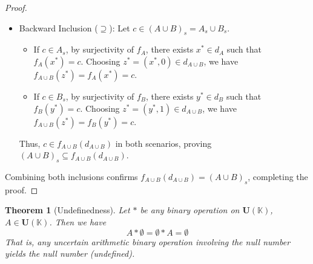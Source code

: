 \documentclass[a4paper,12pt,twoside]{memoir}
\newtheorem{theorem}{Theorem}[chapter]
\newcommand{\tsbd}[1]{\mathbf{U}(\mathbb{#1})}
\begin{document}
\begin{proof}
\begin{enumerate}[leftmargin=*]
\begin{itemize}[leftmargin=*]
				\item Backward Inclusion ($\supseteq$):
				Let $c \in (A \cup B)_s = A_s \cup B_s$.
				\begin{itemize}
					\item If $c \in A_s$, by surjectivity of $f_A$, there exists $x^* \in d_A$ such that $f_A(x^*) = c$. Choosing $z^* = (x^*, 0) \in d_{A \cup B}$, we have $f_{A \cup B}(z^*) = f_A(x^*) = c$.
					\item If $c \in B_s$, by surjectivity of $f_B$, there exists $y^* \in d_B$ such that $f_B(y^*) = c$. Choosing $z^* = (y^*, 1) \in d_{A \cup B}$, we have $f_{A \cup B}(z^*) = f_B(y^*) = c$.
				\end{itemize}
				Thus, $c \in f_{A \cup B}(d_{A \cup B})$ in both scenarios, proving $(A \cup B)_s \subseteq f_{A \cup B}(d_{A \cup B})$.
			\end{itemize}
		\end{enumerate}
		
		Combining both inclusions confirms $f_{A \cup B}(d_{A \cup B}) = (A \cup B)_s$, completing the proof.
	\end{proof}
	\begin{theorem}[Undefinedness]
		Let $*$ be any binary operation on $\tsbd{K}$, $A \in \tsbd{K}$. Then we have
		\[A * \emptyset = \emptyset * A= \emptyset\]
		That is, any uncertain arithmetic binary operation involving the null number yields the null number (undefined).
	\end{theorem}
	
\end{document}

